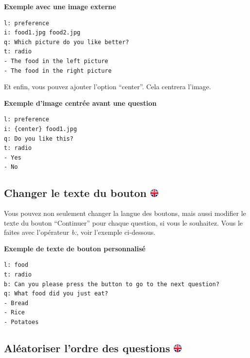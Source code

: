 \documentclass[
]{book}
\begin{document}
\textbf{Exemple avec une image externe}

\begin{verbatim}
l: preference
i: food1.jpg food2.jpg
q: Which picture do you like better?
t: radio
- The food in the left picture
- The food in the right picture
\end{verbatim}

Et enfin, vous pouvez ajouter l'option ``center''. Cela centrera l'image.

\textbf{Exemple d'image centrée avant une question}

\begin{verbatim}
l: preference
i: {center} food1.jpg
q: Do you like this?
t: radio
- Yes
- No
\end{verbatim}

\hypertarget{changer-le-texte-du-bouton}{%
\subsection[Changer le texte du bouton ]{\texorpdfstring{Changer le texte du bouton \href{https://www.psytoolkit.org/doc3.4.0/online-survey-syntax.html\#buttontext}{\protect\includegraphics{img/ukflag.png}}}{Changer le texte du bouton }}\label{changer-le-texte-du-bouton}}

Vous pouvez non seulement changer la langue des boutons, mais aussi modifier le texte du bouton ``Continuer'' pour chaque question, si vous le souhaitez. Vous le faites avec l'opérateur \emph{b:}, voir l'exemple ci-dessous.

\textbf{Exemple de texte de bouton personnalisé}

\begin{verbatim}
l: food
t: radio
b: Can you please press the button to go to the next question?
q: What food did you just eat?
- Bread
- Rice
- Potatoes
\end{verbatim}

\hypertarget{aluxe9atoriser-lordre-des-questions}{%
\subsection[Aléatoriser l'ordre des questions ]{\texorpdfstring{Aléatoriser l'ordre des questions \href{https://www.psytoolkit.org/doc3.4.0/online-survey-syntax.html\#randomization}{\protect\includegraphics{img/ukflag.png}}}{Aléatoriser l'ordre des questions }}\label{aluxe9atoriser-lordre-des-questions}}
\end{document}
